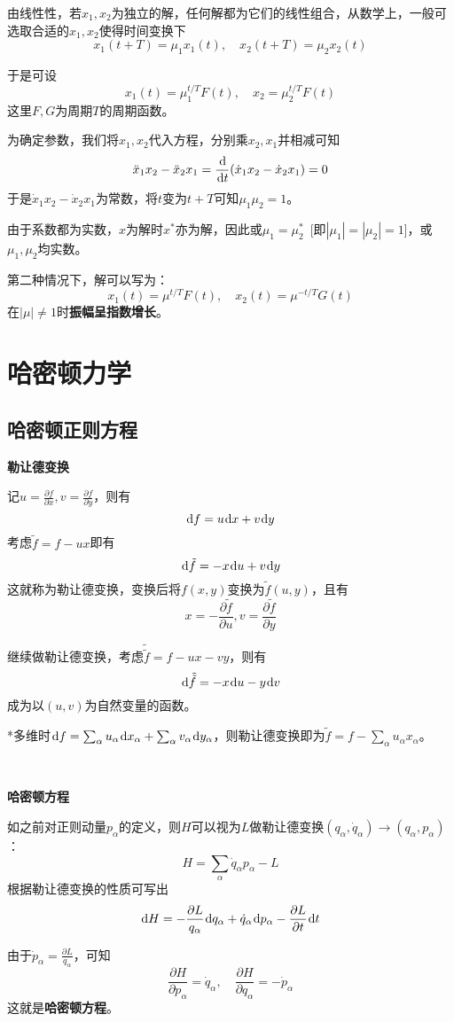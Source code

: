 \documentclass[a4paper,UTF8,fontset=windows]{ctexart}
\newcommand*{\dr}{\hspace{0.07em}\mathrm{d}}
\begin{document}
由线性性，若$x_1,x_2$为独立的解，任何解都为它们的线性组合，从数学上，一般可选取合适的$x_1,x_2$使得时间变换下
$$x_1(t+T)=\mu_1x_1(t),\quad x_2(t+T)=\mu_2x_2(t)$$

于是可设
$$x_1(t)=\mu_1^{t/T}F(t),\quad x_2=\mu_2^{t/T}F(t)$$
这里$F,G$为周期$T$的周期函数。

为确定参数，我们将$x_1,x_2$代入方程，分别乘$x_2,x_1$并相减可知
$$\ddot{x}_1x_2-\ddot{x}_2x_1=\frac{\dr}{\dr t}(\dot{x}_1x_2-\dot{x}_2x_1)=0$$
于是$\dot{x}_1x_2-\dot{x}_2x_1$为常数，将$t$变为$t+T$可知$\mu_1\mu_2=1$。

由于系数都为实数，$x$为解时$x^*$亦为解，因此或$\mu_1=\mu_2^*$\ [即$|\mu_1|=|\mu_2|=1$]，或$\mu_1,\mu_2$均实数。

第二种情况下，解可以写为：
$$x_1(t)=\mu^{t/T}F(t),\quad x_2(t)=\mu^{-t/T}G(t)$$
在$|\mu|\ne1$时\textbf{振幅呈指数增长}。

\section{哈密顿力学}
\subsection{哈密顿正则方程}
\textbf{勒让德变换}

记$u=\frac{\partial f}{\partial x},v=\frac{\partial f}{\partial y}$，则有
$$\dr f=u\dr x+v\dr y$$
考虑$\tilde{f}=f-ux$即有
$$\dr\tilde{f}=-x\dr u+v\dr y$$
这就称为勒让德变换，变换后将$f(x,y)$变换为$\tilde{f}(u,y)$，且有
$$x=-\frac{\partial\tilde{f}}{\partial u},v=\frac{\partial\tilde{f}}{\partial y}$$

继续做勒让德变换，考虑$\tilde{\tilde{f}}=f-ux-vy$，则有
$$\dr\tilde{\tilde{f}}=-x\dr u-y\dr v$$
成为以$(u,v)$为自然变量的函数。

*多维时$\dr f=\sum_\alpha u_\alpha\dr x_\alpha+\sum_\alpha v_\alpha\dr y_\alpha$，则勒让德变换即为$\tilde{f}=f-\sum_\alpha u_\alpha x_\alpha$。

\

\textbf{哈密顿方程}

如之前对正则动量$p_\alpha$的定义，则$H$可以视为$L$做勒让德变换$(q_\alpha,\dot{q}_\alpha)\to(q_\alpha,p_\alpha)$：
$$H=\sum_\alpha\dot{q}_\alpha p_\alpha-L$$
根据勒让德变换的性质可写出
$$\dr H=-\frac{\partial L}{q_\alpha}\dr q_\alpha+\dot{q}_\alpha\dr p_\alpha-\frac{\partial L}{\partial t}\dr t$$

由于$\dot{p}_\alpha=\frac{\partial L}{q_\alpha}$，可知
$$\frac{\partial H}{\partial p_\alpha}=\dot{q}_\alpha,\quad\frac{\partial H}{\partial q_\alpha}=-\dot{p}_\alpha$$
这就是\textbf{哈密顿方程}。
\end{document}
